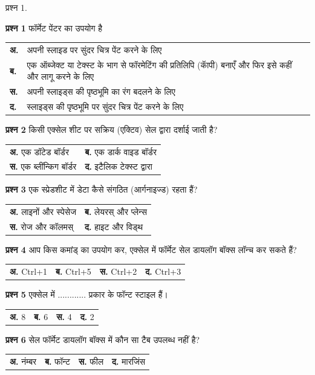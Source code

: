 \def\paragraphTitle#1{\medbreak\noindent{\bfseries \color{red}{#1}}}
\paragraphTitle{वस्तुनिष्ठ प्रश्नः}
\begin{descriptionSimple}{प्रश्न 1.}
\item[\textbf{प्रश्न 1}] फॉर्मेट पेंटर का उपयोग है

  \begin{tabular}{l@{$\;\;\;$}p{10cm}}
	\textbf{अ.} & अपनी स्लाइड पर सुंदर चित्र पेंट करने के लिए\\
	\textbf{ब.}  & एक ऑब्जेक्ट या टेक्स्ट के भाग से फॉरमेटिंग की प्रतिलिपि (कॅापी) बनाएँ और फिर इसे कहीं और लागू करने के लिए\\
	\textbf{स.}  &अपनी स्लाइड्स की पृष्ठभूमि का रंग बदलने के लिए\\
        \textbf{द.}  & स्लाइड्स की पृष्ठभूमि पर सुंदर चित्र पेंट करने के लिए
  \end{tabular}

\item[\textbf{प्रश्न 2}] किसी एक्सेल शीट पर सक्रिय (एक्टिव) सेल द्वारा दर्शाई जाती है?

  \begin{tabular}{ll}	
	\textbf{अ.} एक डॉटेड बॉर्डर & 
        \textbf{ब.} एक डार्क वाइड बॉर्डर\\
        \textbf{स.} एक ब्लींन्किग बॉर्डर & 
        \textbf{द.} इटैलिक टेक्स्ट द्वारा
  \end{tabular}

\item[\textbf{प्रश्न 3}] एक स्प्रेडशीट में डेटा कैसे संगठित (आर्गनाइज्ड) रहता हैं?

  \begin{tabular}{ll}
    \textbf{अ.} लाइनों और स्पेसेज &
    \textbf{ब.} लेयरस् और प्लेन्स\\
    \textbf{स.} रोज और कॉलमस् &
    \textbf{द.} हाइट और विड्थ
  \end{tabular}

\item[\textbf{प्रश्न 4}] आप किस कमांड् का उपयोग कर, एक्सेल में फॉर्मेट सेल डायलॉग बॉक्स लॉन्च कर सकते हैं?

  \begin{tabular}{llll}
	\textbf{अ.} Ctrl+1 &
        \textbf{ब.} Ctrl+5 &
	\textbf{स.} Ctrl+2 &
	\textbf{द.} Ctrl+3
  \end{tabular}

\item[\textbf{प्रश्न 5}] एक्सेल में ............ प्रकार के फॉन्ट स्टाइल हैं।

  \begin{tabular}{llll}
	\textbf{अ.} 8 &
	\textbf{ब.} 6 &
	\textbf{स.} 4 &
	\textbf{द.} 2
  \end{tabular}

\item[\textbf{प्रश्न 6}] सेल फॉर्मेट डायलॉग बॉक्स में कौन सा टैब उपलब्ध नहीं है?

  \begin{tabular}{llll}
    \textbf{अ.} नंम्बर &
    \textbf{ब.} फॉन्ट &
    \textbf{स.} फील &
    \textbf{द.} मारजिंस
  \end{tabular}
\end{descriptionSimple}

